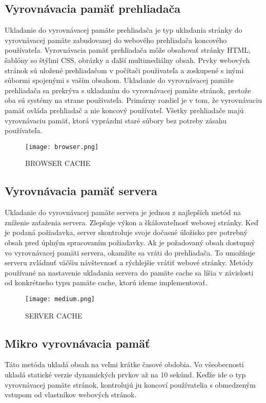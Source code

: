 \documentclass[10pt,oneside,slovak,a4paper]{article}
\begin{document}
\subsection{Vyrovnávacia pamäť prehliadača}
\quad Ukladanie do vyrovnávacej pamäte prehliadača je typ ukladania stránky do vyrovnávacej pamäte zabudovanej do webového prehliadača koncového používateľa. Vyrovnávacia pamäť prehliadača môže obsahovať stránky HTML, šablóny so štýlmi CSS, obrázky a ďalší multimediálny obsah. Prvky webových stránok sú uložené prehliadačom v počítači použivateľa a zoskupené s inými súbormi spojenými s vaším obsahom.
Ukladanie do vyrovnávacej pamäte prehliadača sa prekrýva s ukladaním do vyrovnávacej pamäte stránok, pretože oba sú systémy na strane použivateľa. Primárny rozdiel je v tom, že vyrovnávaciu pamäť ovláda prehliadač a nie koncový používateľ. Všetky prehliadače majú vyrovnávaciu pamäť, ktorá vyprázdni staré súbory bez potreby zásahu používateľa.


\begin{figure}[H]
\centering
\texttt{[image: browser.png]}
\caption{BROWSER CACHE\cite{OCEAN}}
\label{fig:diag}
\end{figure}

\subsection{Vyrovnávacia pamäť servera}
\quad 

Ukladanie do vyrovnávacej pamäte servera je jednou z najlepších metód na zníženie zaťaženia servera. Zlepšuje výkon a škálovateľnosť webovej stránky. Keď je podaná požiadavka, server skontroluje svoje dočasné úložisko pre potrebný obsah pred úplným spracovaním požiadavky. Ak je požadovaný obsah dostupný vo vyrovnávacej pamäti servera, okamžite sa vráti do prehliadača. To umožňuje  serveru zvládnuť väčšiu návštevnosť a rýchlejšie vrátiť  webové stránky.
Metódy používané na nastavenie ukladania servera do pamäte cache sa líšia v závislosti od konkrétneho typu pamäte cache, ktorú ideme implementovať.


\begin{figure}[H]
\centering
\texttt{[image: medium.png]}
\caption{SERVER CACHE\cite{MEDIUM}}
\label{fig:diag}
\end{figure}


\subsection{Mikro vyrovnávacia pamäť}
\quad Táto metóda ukladá obsah na veľmi krátke časové obdobia. Vo všeobecnosti ukladá statické verzie dynamických prvkov až na 10 sekúnd. Keďže ide o typ vyrovnávacej pamäte stránok, kontrolujú ju koncoví používatelia s obmedzeným vstupom od vlastníkov webových stránok.
\end{document}
